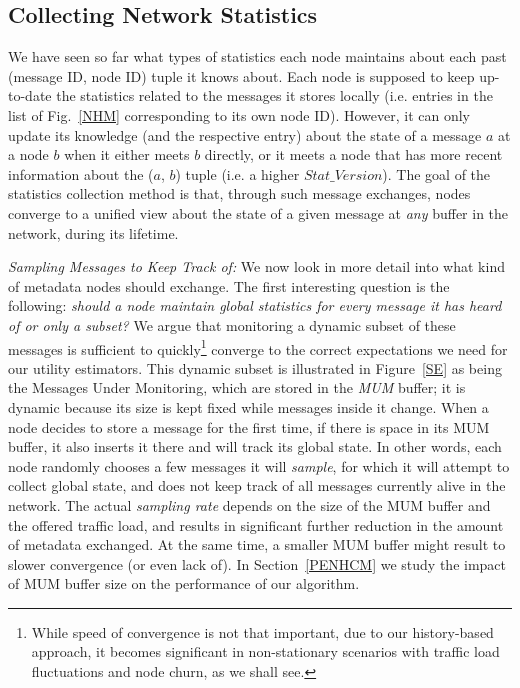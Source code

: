 \subsection{Collecting Network Statistics}
\label{NHCM}

We have seen so far what types of statistics each node maintains about each past (message ID, node ID) tuple it knows about. Each node is supposed to keep up-to-date the statistics related to the messages it stores locally (i.e. entries in the list of Fig.~\ref{NHM} corresponding to its own node ID). However, it can only update its knowledge (and the respective entry) about the state of a message $a$ at a node $b$ when it either meets $b$ directly, or it meets a node that has more recent information about the ($a$, $b$) tuple (i.e. a higher $Stat\_Version$). The goal of the statistics collection method is that, through such message exchanges, nodes converge to a unified view about the state of a given message at \emph{any} buffer in the network, during its lifetime.

\emph{Sampling Messages to Keep Track of:} We now look in more detail into what kind of metadata nodes should exchange. The first interesting question is the following: \emph{should a node maintain global statistics for \emph{every} message it has heard of or only a subset?} We argue that monitoring a dynamic subset of these messages is sufficient to quickly\footnote{While speed of convergence is not that important, due to our history-based approach, it becomes significant in non-stationary scenarios with traffic load fluctuations and node churn, as we shall see.} converge to the correct expectations we need for our utility estimators. This dynamic subset is illustrated in Figure~\ref{SE} as being the Messages Under Monitoring, which are stored in the \emph{MUM} buffer; it is dynamic because its size is kept fixed while messages inside it change. When a node decides to store a message for the first time, if there is space in its MUM buffer, it also inserts it there and will track its global state.  In other words, each node randomly chooses a few messages it will \emph{sample}, for which it will attempt to collect global state, and does not keep track of all messages currently alive in the network. The actual \emph{sampling rate} depends on the size of the MUM buffer and the offered traffic load, and results in significant further reduction in the amount of metadata exchanged. At the same time, a smaller MUM buffer might result to slower convergence (or even lack of). In Section~\ref{PENHCM} we study the impact of MUM buffer size on the performance of our algorithm.

